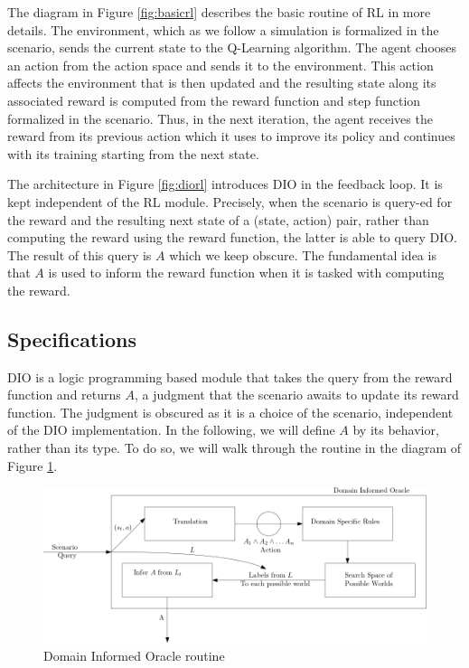 \documentclass[a4paper,11pt]{article}
\theoremstyle{definition}
\begin{document}
The diagram in Figure \ref{fig:basicrl} describes the basic routine of RL in more details. The environment, which as we follow a simulation is formalized in the scenario, sends the current state 
to the Q-Learning algorithm. The agent chooses an action from the action space and sends it to the environment. This action affects the environment that is then 
updated and the resulting state along its associated reward is computed from the reward function and step function formalized in the scenario. Thus, in the next iteration, the 
agent receives the reward from its previous action which it uses to improve its policy and continues with its training starting from the next state.  

\medskip 

The architecture in Figure \ref{fig:diorl} introduces DIO in the feedback loop. It is kept independent of the RL module. Precisely, when the scenario is query-ed for the reward and 
the resulting next state of a (state, action) pair, rather than computing the reward using the reward function, the latter is able to query DIO. The result of this query is $A$ which we keep 
obscure. The fundamental idea is that $A$ is used to inform the reward function when it is tasked with computing the reward. 

\subsection{Specifications} \label{scspecs}
DIO is a logic programming based module that takes the query from the reward function and returns $A$, a judgment that the scenario awaits to update its reward function. The judgment is obscured as it is a choice of the scenario, 
independent of the DIO implementation. In the following, we will define $A$ by its behavior, rather than its type. To do so, we will walk through the routine in the diagram of Figure \ref{fig:diospecs}.


\begin{figure}[H]
  \centering
  \includegraphics[scale=0.46]{diospecs.png}
  \caption{Domain Informed Oracle routine}
  \label{fig:diospecs}
\end{figure}
\end{document}
